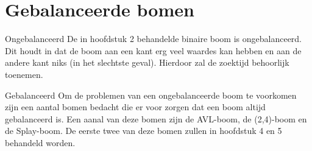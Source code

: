 \chapter{Gebalanceerde bomen}
\label{sec:Hoofdstuk 3}

Ongebalanceerd
De in hoofdstuk 2 behandelde binaire boom is ongebalanceerd. Dit houdt in dat de boom aan een kant erg veel waardes kan hebben en aan de andere kant niks (in het slechtste geval). Hierdoor zal de zoektijd behoorlijk toenemen.

Gebalanceerd
Om de problemen van een ongebalanceerde boom te voorkomen zijn een aantal bomen bedacht die er voor zorgen dat een boom altijd gebalanceerd is. Een aanal van deze bomen zijn de AVL-boom, de (2,4)-boom en de Splay-boom. De eerste twee van deze bomen zullen in hoofdstuk 4 en 5 behandeld worden.

